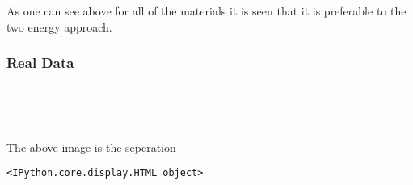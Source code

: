 \documentclass[11pt]{article}
\begin{document}
    As one can see above for all of the materials it is seen that it is
preferable to the two energy approach.

    \hypertarget{real-data}{%
\subsubsection{Real Data}\label{real-data}}



    \begin{center}
    \end{center}
    { \hspace*{\fill} \\}
    
    \begin{center}
    \end{center}
    { \hspace*{\fill} \\}
    
    The above image is the seperation



    
    \begin{verbatim}
<IPython.core.display.HTML object>
    \end{verbatim}

    


            


            


            


            


    \begin{center}
    \end{center}
    { \hspace*{\fill} \\}
    


    \begin{center}
    \end{center}
    { \hspace*{\fill} \\}
    
\end{document}
